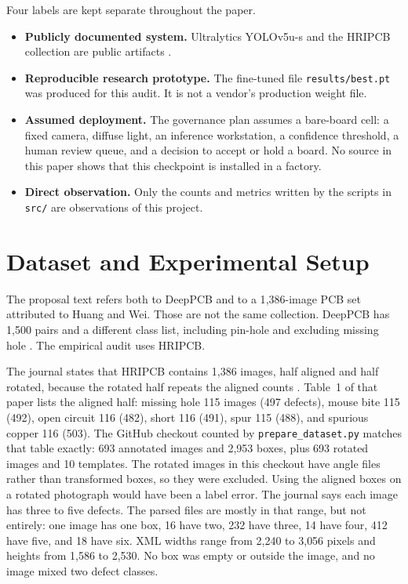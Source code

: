 \documentclass[conference]{IEEEtran}
\begin{document}
Four labels are kept separate throughout the paper.
\begin{itemize}
\item \textbf{Publicly documented system.} Ultralytics YOLOv5u-s and the HRIPCB collection are public artifacts \cite{ultralytics2026yolov5docs,huang2020hripcb}.
\item \textbf{Reproducible research prototype.} The fine-tuned file \texttt{results/best.pt} was produced for this audit. It is not a vendor's production weight file.
\item \textbf{Assumed deployment.} The governance plan assumes a bare-board cell: a fixed camera, diffuse light, an inference workstation, a confidence threshold, a human review queue, and a decision to accept or hold a board. No source in this paper shows that this checkpoint is installed in a factory.
\item \textbf{Direct observation.} Only the counts and metrics written by the scripts in \texttt{src/} are observations of this project.
\end{itemize}

\section{Dataset and Experimental Setup}
\label{sec:data}
The proposal text refers both to DeepPCB and to a 1{,}386-image PCB set attributed to Huang and Wei. Those are not the same collection. DeepPCB has 1{,}500 pairs and a different class list, including pin-hole and excluding missing hole \cite{tang2019deeppcb}. The empirical audit uses HRIPCB.

The journal states that HRIPCB contains 1{,}386 images, half aligned and half rotated, because the rotated half repeats the aligned counts \cite{huang2020hripcb}. Table~1 of that paper lists the aligned half: missing hole 115 images (497 defects), mouse bite 115 (492), open circuit 116 (482), short 116 (491), spur 115 (488), and spurious copper 116 (503). The GitHub checkout counted by \texttt{prepare\_dataset.py} matches that table exactly: 693 annotated images and 2{,}953 boxes, plus 693 rotated images and 10 templates. The rotated images in this checkout have angle files rather than transformed boxes, so they were excluded. Using the aligned boxes on a rotated photograph would have been a label error. The journal says each image has three to five defects. The parsed files are mostly in that range, but not entirely: one image has one box, 16 have two, 232 have three, 14 have four, 412 have five, and 18 have six. XML widths range from 2{,}240 to 3{,}056 pixels and heights from 1{,}586 to 2{,}530. No box was empty or outside the image, and no image mixed two defect classes.
\end{document}
